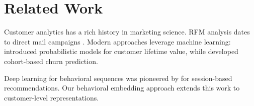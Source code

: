 \section{Related Work}


Customer analytics has a rich history in marketing science. RFM analysis dates to direct mail campaigns \cite{hughes1994}. Modern approaches leverage machine learning: \cite{fader2005} introduced probabilistic models for customer lifetime value, while \cite{gupta2006} developed cohort-based churn prediction.

Deep learning for behavioral sequences was pioneered by \cite{hidasi2016} for session-based recommendations. Our behavioral embedding approach extends this work to customer-level representations.

